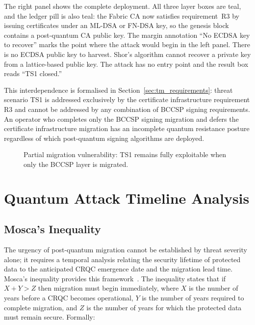 \documentclass[conference]{IEEEtran}
\begin{document}
The right panel shows the complete \mfabric{} deployment. All three layer
boxes are teal, and the ledger pill is also teal: the Fabric CA now satisfies
requirement~R3 by issuing certificates under an ML-DSA or FN-DSA key, so the
genesis block contains a post-quantum CA public key. The margin annotation
``No ECDSA key to recover'' marks the point where the attack would begin in
the left panel. There is no ECDSA public key to harvest. Shor's algorithm
cannot recover a private key from a lattice-based public key. The attack
has no entry point and the result box reads ``TS1 closed.''

This interdependence is formalised in Section~\ref{sec:tm_requirements}:
threat scenario TS1 is addressed exclusively by the certificate
infrastructure requirement R3 and cannot be addressed by any combination
of BCCSP signing requirements. An operator who completes only the BCCSP
signing migration and defers the certificate infrastructure migration
has an incomplete quantum resistance posture regardless of which
post-quantum signing algorithms are deployed.

\begin{figure}[ht]
\centering

\caption{Partial migration vulnerability: TS1 remains fully exploitable when only the BCCSP layer is migrated.}
\label{fig:partial_migration}
\end{figure}

\section{Quantum Attack Timeline Analysis}
\label{sec:tm_mosca}

\subsection{Mosca's Inequality}

The urgency of post-quantum migration cannot be established by threat
severity alone; it requires a temporal analysis relating the security
lifetime of protected data to the anticipated CRQC emergence date and the
migration lead time. Mosca's inequality provides this framework~\cite{mosca2018}.
The inequality states that if $X + Y > Z$ then migration must begin
immediately, where $X$ is the number of years before a CRQC becomes
operational, $Y$ is the number of years required to complete migration,
and $Z$ is the number of years for which the protected data must remain
secure. Formally:
\end{document}

